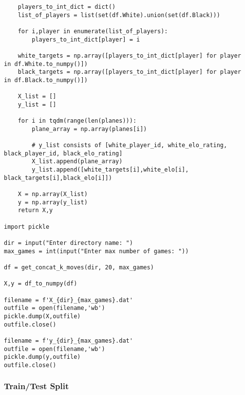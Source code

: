 \begin{verbatim}
    players_to_int_dict = dict()
    list_of_players = list(set(df.White).union(set(df.Black)))

    for i,player in enumerate(list_of_players):
        players_to_int_dict[player] = i
        
    white_targets = np.array([players_to_int_dict[player] for player in df.White.to_numpy()])
    black_targets = np.array([players_to_int_dict[player] for player in df.Black.to_numpy()])

    X_list = []
    y_list = []

    for i in tqdm(range(len(planes))):
        plane_array = np.array(planes[i])

        # y_list consists of [white_player_id, white_elo_rating, black_player_id, black_elo_rating]
        X_list.append(plane_array)
        y_list.append([white_targets[i],white_elo[i], black_targets[i],black_elo[i]])

    X = np.array(X_list)
    y = np.array(y_list)
    return X,y

import pickle

dir = input("Enter directory name: ")
max_games = int(input("Enter max number of games: "))

df = get_concat_k_moves(dir, 20, max_games)

X,y = df_to_numpy(df)

filename = f'X_{dir}_{max_games}.dat'
outfile = open(filename,'wb')
pickle.dump(X,outfile)
outfile.close()

filename = f'y_{dir}_{max_games}.dat'
outfile = open(filename,'wb')
pickle.dump(y,outfile)
outfile.close()
\end{verbatim}

\subsubsection{Train/Test Split}

